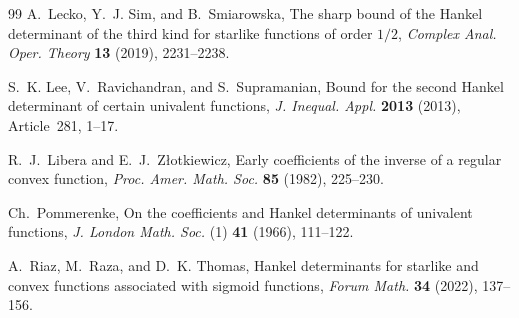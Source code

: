 \documentclass[a4paper,12pt,reqno]{amsart}
\numberwithin{equation}{section}
\begin{document}
\begin{thebibliography}{99}
	A.~Lecko, Y.~J. Sim, and B.~Smiarowska,
	The sharp bound of the Hankel determinant of the third kind for starlike functions of order $1/2$,
	\emph{Complex Anal. Oper. Theory} \textbf{13} (2019), 2231--2238.
	
	S.~K. Lee, V.~Ravichandran, and S.~Supramanian,
	Bound for the second Hankel determinant of certain univalent functions,
	\emph{J. Inequal. Appl.} \textbf{2013} (2013), Article~281, 1--17.
	
	R.~J.~Libera and E.~J.~Z{\l}otkiewicz,
	Early coefficients of the inverse of a regular convex function,
	\emph{Proc. Amer. Math. Soc.} \textbf{85} (1982), 225--230.
	
	Ch.~Pommerenke,
	On the coefficients and Hankel determinants of univalent functions,
	\emph{J. London Math. Soc.} (1) \textbf{41} (1966), 111--122.
	
	A.~Riaz, M.~Raza, and D.~K. Thomas,
	Hankel determinants for starlike and convex functions associated with sigmoid functions,
	\emph{Forum Math.} \textbf{34} (2022), 137--156.
	
\end{thebibliography}
	
\end{document}
